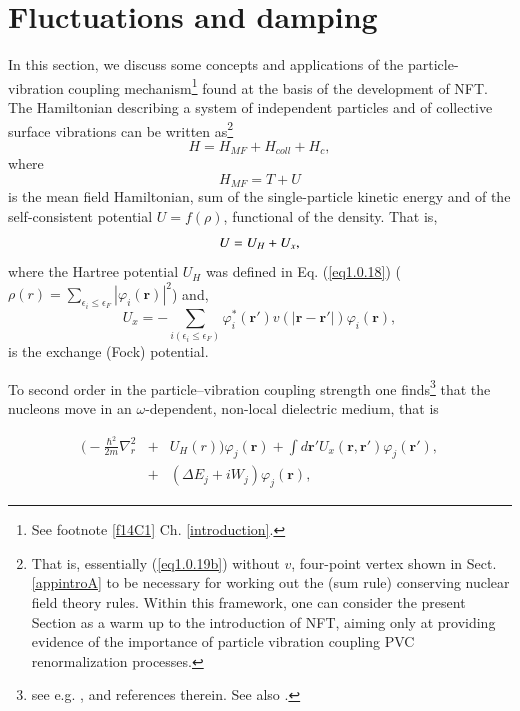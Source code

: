 \section{Fluctuations and damping}\label{appintroD}
In this section, we discuss some concepts and applications of the particle-vibration coupling mechanism\footnote{See footnote \ref{f14C1} Ch. \ref{introduction}.} found at the basis of the development of NFT.
The Hamiltonian describing a system of independent particles and of collective surface vibrations can be written as\footnote{That is, essentially (\ref{eq1.0.19b}) without $v$, four-point vertex shown in Sect. \ref{appintroA} to be necessary for working out the (sum rule) conserving nuclear field theory rules. Within this framework, one can consider the present Section as a warm up to the introduction of NFT, aiming only at providing evidence of the importance of particle vibration coupling PVC renormalization processes.} 
\begin{equation}\label{eqn:30}
H = H_{MF}  + H_{coll} + H_{c} ,
\end{equation}
where
\begin{equation}\label{eq1.3.2}
H_{MF}=T+U
\end{equation}
is the mean field Hamiltonian, sum of the single-particle kinetic energy and of the self-consistent potential $U=f(\rho)$, functional of the  density. That is,
\begin{equation}
U=U_H+U_x,\idx{Hartree-Fock field}
\end{equation}
where the Hartree potential $U_H$ was defined in Eq. (\ref{eq1.0.18}) ($\rho(r)=\sum_{\epsilon_i\leq\epsilon_F}|\varphi_i(\mathbf r)|^2$) and,
\begin{equation}\label{eq2.3.4}
U_x=-\sum_{i(\epsilon_i\leq\epsilon_F)}\varphi_i^*(\mathbf r')v(|\mathbf r- \mathbf r'|)\varphi_i(\mathbf r),
\end{equation}
is the exchange (Fock) potential. 



 To second order in the particle--vibration coupling strength one finds\footnote{see e.g. \cite{Brink:05}, \cite{Mahaux:85} and references therein. See also \cite{Bernard:81}.} that the nucleons move in an $\omega$-dependent, non-local dielectric medium, that is 

\begin{eqnarray}\label{eqn:36}
\nonumber
\Big( -\frac{\hbar^2}{2m} \nabla_r^2 &+& U_H(r)\Big) \varphi_{j}(\mathbf r) + \int d\mathbf r' U_x(\mathbf r,\mathbf r')\varphi_j(\mathbf r'), \\
\nonumber
&+& (\Delta E_j +iW_j)\varphi_j(\mathbf r), 
\end{eqnarray}

